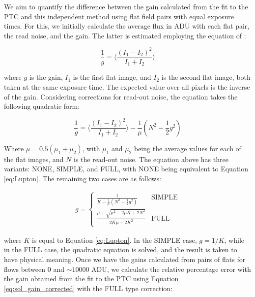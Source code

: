 \vspace{3mm}
We aim to quantify the difference between the gain calculated from the fit to the PTC and this independent method using flat field pairs with equal exposure times. For this, we initially calculate the average flux in ADU with each flat pair, the read noise, and the gain. The latter is estimated employing the equation of \cite{2014JInst...9C4023L}:

\begin{equation}
    \frac{1}{g} = \Big \langle \frac{(I_1 - I_2)^2}{I_1 + I_2} \Big \rangle 
    \label{eq:Lupton}
\end{equation}

where $g$ is the gain, $I_1$ is the first flat image, and $I_2$ is the second flat image, both taken at the same exposure time. The expected value over all pixels is the inverse of the gain. Considering corrections for read-out noise, the equation takes the following quadratic form:

\begin{equation}
    \frac{1}{g} = \Big \langle \frac{(I_1 - I_2)^2}{I_1 + I_2} \Big \rangle - \frac{1}{\mu} (N^2-\frac{1}{2} g^2)
    \label{eq:gain_corrected}
\end{equation}

Where $\mu = 0.5(\mu_1 + \mu_2)$, with $\mu_1$ and $\mu_2$ being the average values for each of the flat images, and $N$ is the read-out noise. The equation above has three variants: NONE, SIMPLE, and FULL, with NONE being equivalent to Equation \ref{eq:Lupton}. The remaining two cases are as follows:

\begin{align}
g = \begin{cases}
  \frac{1}{K - \frac{1}{\mu}(N^2 - \frac{1}{2} g^2)} & \mbox{SIMPLE} \\
  \frac{\mu + \sqrt{\mu^2 - 2 \mu K + 2 N^2}}{2 K \mu - 2 K^2} & \mbox{FULL}
\end{cases}
\label{eq:sol_gain_corrected}
\end{align}

where $K$ is equal to Equation \ref{eq:Lupton}. In the SIMPLE case, $g = 1/K$, while in the FULL case, the quadratic equation is solved, and the result is taken to have physical meaning. Once we have the gains calculated from pairs of flats for flows between 0 and $\sim 10000$ ADU, we calculate the relative percentage error with the gain obtained from the fit to the PTC using Equation \ref{eq:sol_gain_corrected} with the FULL type correction:

